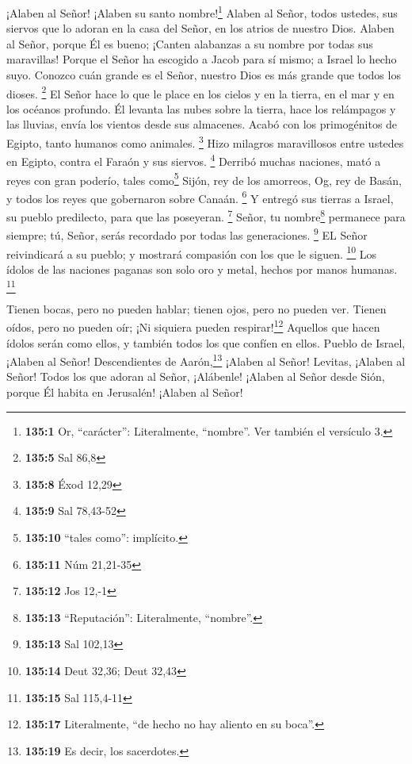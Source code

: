  ¡Alaben al Señor! ¡Alaben su santo nombre!\footnote{\textbf{135:1}
  Or, ``carácter'': Literalmente, ``nombre''. Ver también el versículo
  3.} Alaben al Señor, todos ustedes, sus siervos  que lo
adoran en la casa del Señor, en los atrios de nuestro Dios.
 Alaben al Señor, porque Él es bueno; ¡Canten alabanzas a
su nombre por todas sus maravillas!  Porque el Señor ha
escogido a Jacob para sí mismo; a Israel lo hecho suyo. 
Conozco cuán grande es el Señor, nuestro Dios es más grande que todos
los dioses. \footnote{\textbf{135:5} Sal 86,8}  El Señor
hace lo que le place en los cielos y en la tierra, en el mar y en los
océanos profundo.  Él levanta las nubes sobre la tierra,
hace los relámpagos y las lluvias, envía los vientos desde sus
almacenes.  Acabó con los primogénitos de Egipto, tanto
humanos como animales. \footnote{\textbf{135:8} Éxod 12,29}
 Hizo milagros maravillosos entre ustedes en Egipto,
contra el Faraón y sus siervos. \footnote{\textbf{135:9} Sal 78,43-52}
 Derribó muchas naciones, mató a reyes con gran poderío,
tales como\footnote{\textbf{135:10} ``tales como'': implícito.}
 Sijón, rey de los amorreos, Og, rey de Basán, y todos
los reyes que gobernaron sobre Canaán. \footnote{\textbf{135:11} Núm
  21,21-35}  Y entregó sus tierras a Israel, su pueblo
predilecto, para que las poseyeran. \footnote{\textbf{135:12} Jos 12,-1}
 Señor, tu nombre\footnote{\textbf{135:13}
  ``Reputación'': Literalmente, ``nombre''.} permanece para siempre; tú,
Señor, serás recordado por todas las generaciones. \footnote{\textbf{135:13}
  Sal 102,13}  EL Señor reivindicará a su pueblo; y
mostrará compasión con los que le siguen. \footnote{\textbf{135:14} Deut
  32,36; Deut 32,43}  Los ídolos de las naciones paganas
son solo oro y metal, hechos por manos humanas. \footnote{\textbf{135:15}
  Sal 115,4-11}

 Tienen bocas, pero no pueden hablar; tienen ojos, pero
no pueden ver.  Tienen oídos, pero no pueden oír; ¡Ni
siquiera pueden respirar!\footnote{\textbf{135:17} Literalmente, ``de
  hecho no hay aliento en su boca''.}  Aquellos que hacen
ídolos serán como ellos, y también todos los que confíen en ellos.
 Pueblo de Israel, ¡Alaben al Señor! Descendientes de
Aarón,\footnote{\textbf{135:19} Es decir, los sacerdotes.} ¡Alaben al
Señor!  Levitas, ¡Alaben al Señor! Todos los que adoran
al Señor, ¡Alábenle!  ¡Alaben al Señor desde Sión, porque
Él habita en Jerusalén! ¡Alaben al Señor!

